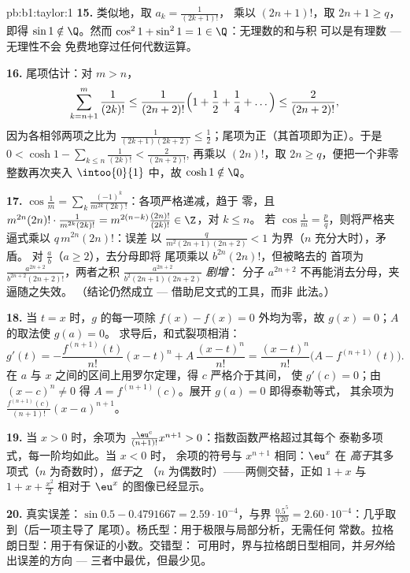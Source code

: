 \begin{solution}{pb:b1:taylor:1}
\textbf{15.} 类似地，取 $a_k = \frac{1}{(2k+1)!}$，
乘以 $(2n+1)!$，取 $2n + 1 \geq q$，即得 $\sin 1 \notin
\Q$。然而 $\cos^2 1 + \sin^2 1 = 1 \in \Q$：无理数的和与积
可以是有理数 --- 无理性不会
免费地穿过任何代数运算。

\textbf{16.} 尾项估计：对 $m > n$，
\[
\sum_{k=n+1}^{m} \frac{1}{(2k)!}
\leq \frac{1}{(2n+2)!}\Bigl(1 + \frac12 + \frac14 +
\dots\Bigr) \leq \frac{2}{(2n+2)!} ,
\]
因为各相邻两项之比为 $\frac{1}{(2k+1)(2k+2)} \leq
\frac12$；尾项为正（其首项即为正）。于是 $0 <
\cosh 1 - \sum_{k\leq n}\frac{1}{(2k)!} < \frac{2}{(2n+2)!}$,
再乘以 $(2n)!$，取 $2n \geq q$，便把一个非零
整数再次夹入 $\intoo{0}{1}$ 中，故 $\cosh 1 \notin \Q$。

\textbf{17.} $\cos\frac1m = \sum_k
\frac{(-1)^k}{m^{2k}(2k)!}$：各项严格递减，趋于
零，且 $m^{2n}(2n)!\cdot\frac{1}{m^{2k}(2k)!} =
m^{2(n-k)}\frac{(2n)!}{(2k)!} \in \Z$，对 $k \leq n$。
若 $\cos\frac1m = \frac pq$，则将严格夹逼式乘以
$q\,m^{2n}(2n)!$：误差
以 $\frac{q}{m^2(2n+1)(2n+2)} < 1$ 为界（$n$ 充分大时），矛盾。
对 $\frac ab$（$a \geq 2$），去分母即将
尾项乘以 $b^{2n}(2n)!$，但被略去的
首项为 $\frac{a^{2n+2}}{b^{2n+2}(2n+2)!}$，两者之积
$\frac{a^{2n+2}}{b^2(2n+1)(2n+2)}$ \emph{剧增}：
分子 $a^{2n+2}$ 不再能消去分母，夹逼随之失效。
（结论仍然成立 --- 借助尼文式的工具，而非
此法。）

\textbf{18.} 当 $t = x$ 时，$g$ 的每一项除 $f(x)
- f(x) = 0$ 外均为零，故 $g(x) = 0$；$A$ 的取法使 $g(a) = 0$。
求导后，和式裂项相消：
\[
g'(t) = -\frac{f^{(n+1)}(t)}{n!}(x - t)^n +
A\,\frac{(x-t)^n}{n!}
= \frac{(x-t)^n}{n!}\bigl(A - f^{(n+1)}(t)\bigr) .
\]
在 $a$ 与 $x$ 之间的区间上用罗尔定理，得 $c$ 严格介于其间，
使 $g'(c) = 0$；由 $(x - c)^n \neq 0$ 得 $A =
f^{(n+1)}(c)$。展开 $g(a) = 0$ 即得泰勒等式，
其余项为 $\frac{f^{(n+1)}(c)}{(n+1)!}(x-a)^{n+1}$。

\textbf{19.} 当 $x > 0$ 时，余项为 $\frac{\eu^{c}}
{(n+1)!}x^{n+1} > 0$：指数函数严格超过其每个
泰勒多项式，每一阶均如此。当 $x < 0$ 时，
余项的符号与 $x^{n+1}$ 相同：$\eu^x$ 在
\emph{高于}其多项式（$n$ 为奇数时），\emph{低于}之
（$n$ 为偶数时）——两侧交替，正如 $1 + x$ 与 $1
+ x + \frac{x^2}{2}$ 相对于 $\eu^x$ 的图像已经显示。

\textbf{20.} 真实误差：$\sin 0.5 - 0.4791667 =
2.59\cdot10^{-4}$，与界 $\frac{0.5^5}{120} =
2.60\cdot10^{-4}$：几乎取到（后一项主导了
尾项）。杨氏型：用于极限与局部分析，无需任何
常数。拉格朗日型：用于有保证的小数。交错型：
可用时，界与拉格朗日型相同，并\emph{另外}给出误差的方向 ---
三者中最优，但最少见。


\end{solution}

